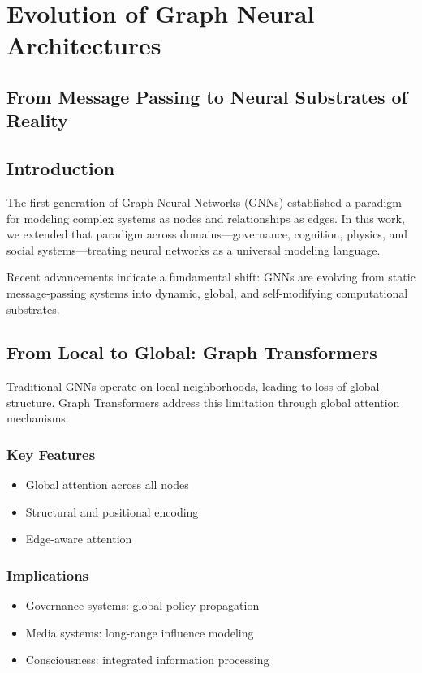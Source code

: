 \chapter{Evolution of Graph Neural Architectures}
\section*{From Message Passing to Neural Substrates of Reality}

\section{Introduction}
The first generation of Graph Neural Networks (GNNs) established a paradigm for modeling complex systems as nodes and relationships as edges. In this work, we extended that paradigm across domains---governance, cognition, physics, and social systems---treating neural networks as a universal modeling language.

Recent advancements indicate a fundamental shift: GNNs are evolving from static message-passing systems into dynamic, global, and self-modifying computational substrates.

\section{From Local to Global: Graph Transformers}
Traditional GNNs operate on local neighborhoods, leading to loss of global structure. Graph Transformers address this limitation through global attention mechanisms.

\subsection{Key Features}
\begin{itemize}
\item Global attention across all nodes
\item Structural and positional encoding
\item Edge-aware attention
\end{itemize}

\subsection{Implications}
\begin{itemize}
\item Governance systems: global policy propagation
\item Media systems: long-range influence modeling
\item Consciousness: integrated information processing
\end{itemize}

